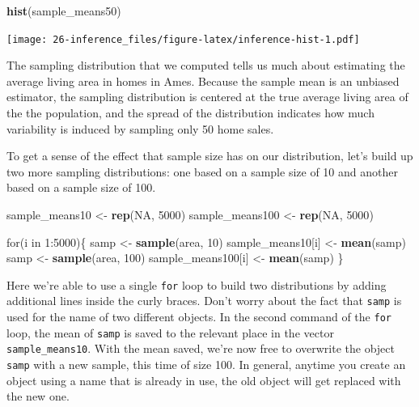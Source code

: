 \documentclass[]{book}
\newenvironment{Shaded}{\begin{snugshade}}{\end{snugshade}}
\newcommand{\KeywordTok}[1]{\textcolor[rgb]{0.13,0.29,0.53}{\textbf{{#1}}}}
\newcommand{\DecValTok}[1]{\textcolor[rgb]{0.00,0.00,0.81}{{#1}}}
\newcommand{\StringTok}[1]{\textcolor[rgb]{0.31,0.60,0.02}{{#1}}}
\newcommand{\OtherTok}[1]{\textcolor[rgb]{0.56,0.35,0.01}{{#1}}}
\newcommand{\NormalTok}[1]{{#1}}
\theoremstyle{definition}
\theoremstyle{definition}
\theoremstyle{remark}
\begin{document}
\begin{Shaded}
\begin{Highlighting}[]
\KeywordTok{hist}\NormalTok{(sample_means50)}
\end{Highlighting}
\end{Shaded}

\texttt{[image: 26-inference\_files/figure-latex/inference-hist-1.pdf]}

The sampling distribution that we computed tells us much about
estimating the average living area in homes in Ames. Because the sample
mean is an unbiased estimator, the sampling distribution is centered at
the true average living area of the the population, and the spread of
the distribution indicates how much variability is induced by sampling
only 50 home sales.

To get a sense of the effect that sample size has on our distribution,
let's build up two more sampling distributions: one based on a sample
size of 10 and another based on a sample size of 100.

\begin{Shaded}
\begin{Highlighting}[]
\NormalTok{sample_means10 <-}\StringTok{ }\KeywordTok{rep}\NormalTok{(}\OtherTok{NA}\NormalTok{, }\DecValTok{5000}\NormalTok{)}
\NormalTok{sample_means100 <-}\StringTok{ }\KeywordTok{rep}\NormalTok{(}\OtherTok{NA}\NormalTok{, }\DecValTok{5000}\NormalTok{)}

\NormalTok{for(i in }\DecValTok{1}\NormalTok{:}\DecValTok{5000}\NormalTok{)\{}
  \NormalTok{samp <-}\StringTok{ }\KeywordTok{sample}\NormalTok{(area, }\DecValTok{10}\NormalTok{)}
  \NormalTok{sample_means10[i] <-}\StringTok{ }\KeywordTok{mean}\NormalTok{(samp)}
  \NormalTok{samp <-}\StringTok{ }\KeywordTok{sample}\NormalTok{(area, }\DecValTok{100}\NormalTok{)}
  \NormalTok{sample_means100[i] <-}\StringTok{ }\KeywordTok{mean}\NormalTok{(samp)}
\NormalTok{\}}
\end{Highlighting}
\end{Shaded}

Here we're able to use a single \texttt{for} loop to build two
distributions by adding additional lines inside the curly braces. Don't
worry about the fact that \texttt{samp} is used for the name of two
different objects. In the second command of the \texttt{for} loop, the
mean of \texttt{samp} is saved to the relevant place in the vector
\texttt{sample\_means10}. With the mean saved, we're now free to
overwrite the object \texttt{samp} with a new sample, this time of size
100. In general, anytime you create an object using a name that is
already in use, the old object will get replaced with the new one.
\end{document}
